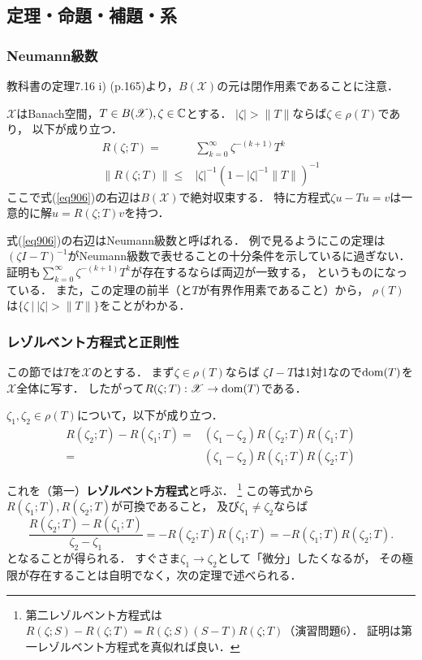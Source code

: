 \documentclass[a4j]{jsarticle}
\newcommand{\spX}{\mathscr{X}}
\begin{document}
    \subsection{定理・命題・補題・系}
    \subsubsection{Neumann級数}
    教科書の定理7.16 i) (p.165)より，$B(\spX)$の元は閉作用素であることに注意．

    \begin{Thm}[定理9.2, p.209] \label{them902}
        $\spX$はBanach空間，$T \in B(\spX), \zeta \in \C$とする．
        $|\zeta| > \|T\|$ならば$\zeta \in \rho(T)$であり，
        以下が成り立つ．
        \begin{align}
            R(\zeta; T)=&\sum_{k=0}^{\infty} \zeta^{-(k+1)} T^k \label{eq906}\\
            \|R(\zeta; T)\| \leq& |\zeta|^{-1} (1-|\zeta|^{-1} \|T\|)^{-1}
        \end{align}
        ここで式(\ref{eq906})の右辺は$B(\spX)$で絶対収束する．
        特に方程式$\zeta u-Tu=v$は一意的に解$u=R(\zeta;T)v$を持つ．
    \end{Thm}
    式(\ref{eq906})の右辺はNeumann級数と呼ばれる．
    例で見るようにこの定理は$(\zeta I-T)^{-1}$がNeumann級数で表せることの十分条件を示しているに過ぎない．
    証明も$\sum_{k=0}^{\infty} \zeta^{-(k+1)} T^k$が存在するならば両辺が一致する，
    というものになっている．
    また，この定理の前半（と$T$が有界作用素であること）から，
    $\rho(T)$は$\{ \zeta ~|~ |\zeta| > \|T\| \}$をことがわかる．

    \subsubsection{レゾルベント方程式と正則性}
    この節では$T$を$\spX$のとする．
    まず$\zeta \in \rho(T)$ならば
    $\zeta I-T$は1対1なので$\operatorname{dom}(T)$を$\spX$全体に写す．
    したがって$R(\zeta;T):\spX \to \dom(T)$である．

    \begin{Thm}
        $\zeta_1, \zeta_2 \in \rho(T)$について，以下が成り立つ．
        \begin{align*}
            R(\zeta_2;T)-R(\zeta_1;T)
            =&(\zeta_1-\zeta_2)R(\zeta_2;T)R(\zeta_1;T) \\
            =&(\zeta_1-\zeta_2)R(\zeta_1;T)R(\zeta_2;T)
        \end{align*}
    \end{Thm}
    これを（第一）\textbf{レゾルベント方程式}と呼ぶ．
    \footnote
    {
        第二レゾルベント方程式は$R(\zeta;S)-R(\zeta;T)=R(\zeta;S)(S-T)R(\zeta;T)$（演習問題6）．
        証明は第一レゾルベント方程式を真似れば良い．
    }
    この等式から$R(\zeta_1;T), R(\zeta_2;T)$が可換であること，
    及び$\zeta_1 \neq \zeta_2$ならば
    \[ \frac{R(\zeta_2;T)-R(\zeta_1;T)}{\zeta_2-\zeta_1}=-R(\zeta_2;T)R(\zeta_1;T)=-R(\zeta_1;T)R(\zeta_2;T). \label{eq-ori901} \]
    となることが得られる．
    すぐさま$\zeta_1 \to \zeta_2$として「微分」したくなるが，
    その極限が存在することは自明でなく，次の定理で述べられる．
\end{document}
